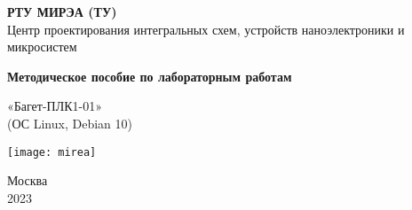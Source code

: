 \begin{titlepage}
	\begin{center}		
		\textbf{РТУ МИРЭА (ТУ)} \\
		Центр проектирования интегральных схем, устройств наноэлектроники и микросистем 
		
		\vspace{5.5cm}
		
		\Large
		\textbf{Методическое пособие по лабораторным работам}
		
		\vspace{0.5cm}
		
		«Багет-ПЛК1-01» \\
		(ОС Linux, Debian 10) \\
				
		\vfill
				
		\vspace{0.8cm}
		
		\texttt{[image: mirea]}
		
		\Large
		Москва\\
		2023
		
	\end{center}
\end{titlepage}	
